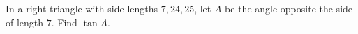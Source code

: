 In a right triangle with side lengths $7,24,25$, let $A$ be the angle opposite the side of length $7$. Find $\tan A$.
